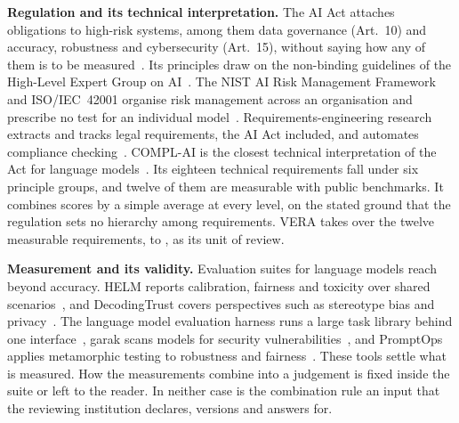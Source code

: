 
\textbf{Regulation and its technical interpretation.}
The AI Act attaches obligations to high-risk systems, among them data governance (Art.~10) and accuracy, robustness and cybersecurity (Art.~15), without saying how any of them is to be measured~\cite{euaiact2024}.
Its principles draw on the non-binding guidelines of the High-Level Expert Group on AI~\cite{hleg2019trustworthyai}.
The NIST AI Risk Management Framework and ISO/IEC~42001 organise risk management across an organisation and prescribe no test for an individual model~\cite{nist2023airmf,iso42001_2023}.
Requirements-engineering research extracts and tracks legal requirements, the AI Act included, and automates compliance checking~\cite{abualhaija2025llmregextraction,abualhaija2024regchange,amaral2022nlpcompliance}.
COMPL-AI is the closest technical interpretation of the Act for language models~\cite{guldimann2024complai}.
Its eighteen technical requirements fall under six principle groups, and twelve of them are measurable with public benchmarks.
It combines scores by a simple average at every level, on the stated ground that the regulation sets no hierarchy among requirements.
VERA takes over the twelve measurable requirements,  to , as its unit of review.

\textbf{Measurement and its validity.}
Evaluation suites for language models reach beyond accuracy.
HELM reports calibration, fairness and toxicity over shared scenarios~\cite{liang2023helm}, and DecodingTrust covers perspectives such as stereotype bias and privacy~\cite{wang2023decodingtrust}.
The language model evaluation harness runs a large task library behind one interface~\cite{gao2021lmevalharness}, garak scans models for security vulnerabilities~\cite{derczynski2024garak}, and PromptOps applies metamorphic testing to robustness and fairness~\cite{sunetnanta2025promptops}.
These tools settle what is measured.
How the measurements combine into a judgement is fixed inside the suite or left to the reader.
In neither case is the combination rule an input that the reviewing institution declares, versions and answers for.

